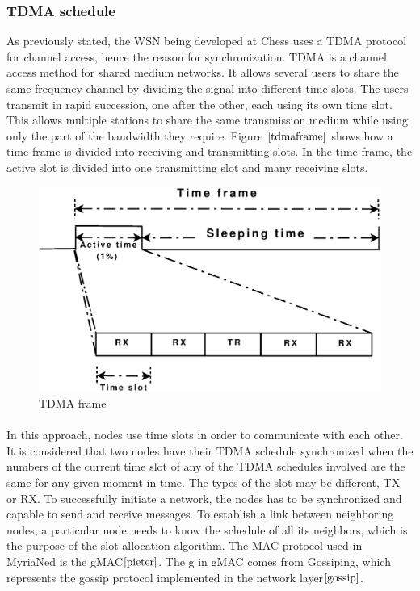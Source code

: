 \documentclass[a4paper,10pt]{report}
\begin{document}
\subsubsection{TDMA schedule}
As previously stated, the WSN being developed at Chess uses a TDMA protocol for channel access, hence the reason for synchronization.
TDMA is a channel access method for shared medium networks. It allows several users to share the same frequency
channel by dividing the signal into different time slots. The users transmit in rapid succession, one after the other, each using its
own time slot. This allows multiple stations to share the same transmission medium while using only the part of the bandwidth they
require. Figure $\ref{tdmaframe}$ shows how a time frame is divided into receiving and transmitting slots. In the time frame, the active slot is divided into one transmitting slot and many receiving slots.
\begin{figure}
\centering
\includegraphics[width=0.4 \textwidth]{tdmaframe}
\caption{TDMA frame} \label{tdmaframe}
\end{figure}
\paragraph*{} 
In this approach, nodes use time slots in order to communicate with each other. It is considered that two nodes have
their TDMA schedule synchronized when the numbers of the current time slot of any of the TDMA schedules involved are the same for any
given moment in time. The types of the slot may be different, TX or RX. To successfully initiate a network, the nodes has to be
synchronized and capable to send and receive messages. To establish a link between neighboring nodes, a particular node needs to know
the schedule of all its neighbors, which is the purpose of the slot allocation algorithm. The MAC protocol used in MyriaNed is the gMAC$\cite{pieter}$. The g in gMAC comes from Gossiping, which represents the gossip protocol implemented in the network layer$\cite{gossip}$.
\end{document}
